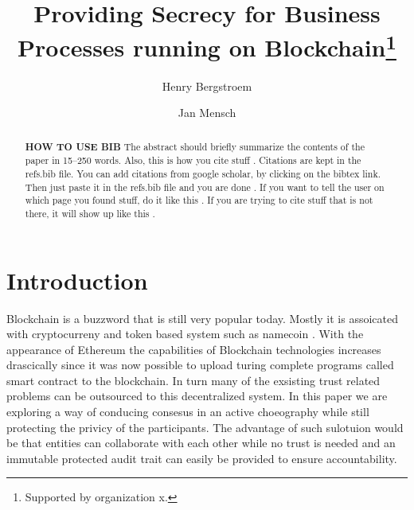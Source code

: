 \documentclass[runningheads]{llncs}
\begin{document}
%
\title{Providing Secrecy for Business Processes running on Blockchain\thanks{Supported by organization x.}}
%
%
\author{Henry Bergstroem \and
Jan Mensch}
%
%

%
\maketitle              %
%
\begin{abstract}
\textbf{\uppercase{how to use bib}} The abstract should briefly summarize the contents of the paper in
15--250 words. Also, this is how you cite stuff \cite{texbook}. Citations are kept in the refs.bib file. You can add citations from google scholar, by clicking on the bibtex link. Then just paste it in the refs.bib file and you are done \cite{web:lang:stats} \cite{latex:companion}. If you want to tell the user on which page you found stuff, do it like this \cite[p.~42]{texbook}. If you are trying to cite stuff that is not there, it will show up like this \cite{kndfljdsjksdjf}.

\end{abstract}

\section{Introduction}
Blockchain is a buzzword that is still very popular today. Mostly it is assoicated with cryptocurreny and token based system such as namecoin \cite{}. With the appearance of Ethereum the capabilities of Blockchain technologies increases drascically since it was now possible to upload turing complete programs called smart contract to the blockchain. In turn many of the exsisting trust related problems can be outsourced to this decentralized system. 
In this paper we are exploring a way of conducing consesus in an active choeography while still protecting the privicy of the participants. The advantage of such sulotuion would be that entities can collaborate with each other while no trust is needed and an immutable protected audit trait can easily be provided to ensure accountability.
\end{document}

